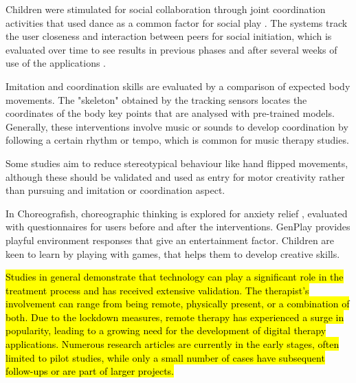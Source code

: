 \documentclass[a4paper,fleqn]{cas-sc}
\begin{document}
Children were stimulated for social collaboration through joint coordination activities that used dance as a common factor for social play \cite{Raygoza-Romero21, Osmosis20, Zampella21} . The systems track the user closeness and interaction between peers for social initiation, which is evaluated over time to see results in previous phases and after several weeks of use of the applications \cite{Osmosis20}.


Imitation and coordination skills are evaluated by a comparison of expected body movements. The "skeleton" obtained by the tracking sensors locates the coordinates of the body key points that are analysed with pre-trained models. Generally, these interventions involve music or sounds to develop coordination by following a certain rhythm or tempo, which is common for music therapy studies.

Some studies aim to reduce stereotypical behaviour like hand flipped movements, although these should be validated and used as entry for motor creativity rather than pursuing and imitation or coordination aspect.
 
In Choreografish, choreographic thinking is explored for anxiety relief \cite{AltizerJr18}, evaluated with questionnaires for users before and after the interventions. GenPlay provides playful environment responses \cite{Crowell18} that give an entertainment factor. Children are keen to learn by playing with games, that helps them to develop creative skills.


\hl{Studies in general demonstrate that technology can play a significant role in the treatment process and has received extensive validation. The therapist's involvement can range from being remote, physically present, or a combination of both. Due to the lockdown measures, remote therapy has experienced a surge in popularity, leading to a growing need for the development of digital therapy applications. Numerous research articles are currently in the early stages, often limited to pilot studies, while only a small number of cases have subsequent follow-ups or are part of larger projects.}
\end{document}

